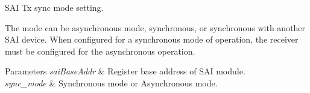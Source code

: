 S\+AI Tx sync mode setting. 

The mode can be asynchronous mode, synchronous, or synchronous with another S\+AI device. When configured for a synchronous mode of operation, the receiver must be configured for the asynchronous operation. 
\begin{DoxyParams}{Parameters}
{\em sai\+Base\+Addr} & Register base address of S\+AI module. \\
\hline
{\em sync\+\_\+mode} & Synchronous mode or Asynchronous mode. \\
\hline
\end{DoxyParams}
